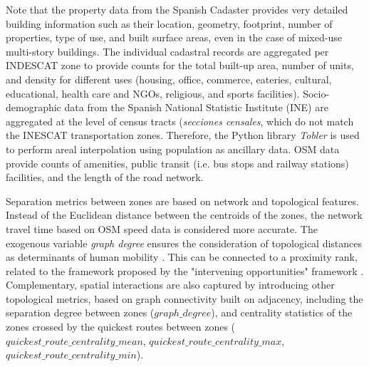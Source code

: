 Note that the property data from the Spanish Cadaster \citep{MinisteriodeHacienda.GobiernodeEspanaSedeInicio} provides very detailed building information such as their location, geometry, footprint, number of properties, type of use, and built surface areas, even in the case of mixed-use multi-story buildings. The individual cadastral records are aggregated per INDESCAT zone to provide counts for the total built-up area, number of units, and density for different uses (housing, office, commerce, eateries, cultural, educational, health care and NGOs, religious, and sports facilities). Socio-demographic data from the Spanish National Statistic Institute (INE) are aggregated at the level of census tracts (\emph{secciones censales}, which do not match the INESCAT transportation zones. Therefore, the Python library \emph{Tobler} \citep{ToblercontributorsToblerManual} is used to perform areal interpolation using population as ancillary data. OSM data provide counts of amenities, public transit (i.e. bus stops and railway stations) facilities, and the length of the road network. %

Separation metrics between zones are based on network and topological features. Instead of the Euclidean distance between the centroids of the zones, the network travel time based on OSM speed data \citep{OpenStreetMap, Boeing2017OSMnx:Networks} is considered more accurate. %
The exogenous variable \emph{graph degree} ensures the consideration of topological distances as determinants of human mobility \citep{Simini2012APatterns, Noulas2012AMobility, Ballerini2008InteractionStudy}. This can be connected to a proximity rank, related to the framework proposed by the "intervening opportunities" framework \citep{Stouffer1940InterveningDistance}. Complementary, spatial interactions are also captured by introducing other topological metrics, based on graph connectivity built on adjacency, including the separation degree between zones ($graph\_degree$), and centrality statistics of the zones crossed by the quickest routes between zones ($quickest\_route\_centrality\_mean$, $quickest\_route\_centrality\_max$, $quickest\_route\_centrality\_min$).

